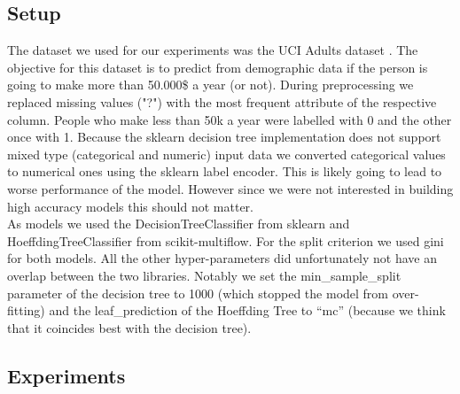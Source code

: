 \documentclass[conference]{IEEEtran}
\begin{document}
\subsection{Setup}
The dataset we used for our experiments was the UCI Adults dataset \cite{b15}. 
The objective for this dataset is to predict from demographic data if the person is going to make more than 50.000\$ a year (or not).
During preprocessing we replaced missing values ("?")  with the most frequent attribute of the respective column.
People who make less than 50k a year were labelled with 0 and the other once with 1.
Because the sklearn decision tree implementation does not support mixed type (categorical and numeric) input data we converted categorical values to numerical ones using the sklearn label encoder. 
This is likely going to lead to worse performance of the model.
However since we were not interested in building high accuracy models this should not matter.\\

As models we used the DecisionTreeClassifier from sklearn and HoeffdingTreeClassifier from scikit-multiflow.
For the split criterion we used gini for both models. 
All the other hyper-parameters did unfortunately not have an overlap between the two libraries. 
Notably we set the min\_sample\_split parameter of the decision tree to 1000 (which stopped the model from over-fitting) and the leaf\_prediction of the Hoeffding Tree to ``mc'' (because we think that it coincides best with the decision tree).\\

\subsection{Experiments}
\end{document}
